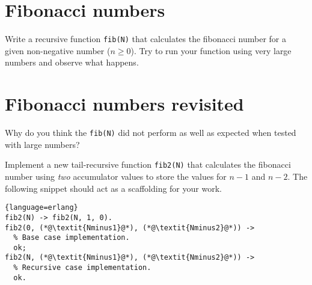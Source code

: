 \documentclass[11pt, a4paper]{article}
\begin{document}
\begin{assignment}

  \section{Fibonacci numbers}

  Write a recursive function \texttt{fib(N)} that calculates the fibonacci number for a given non-negative number (\ie $n \geq 0$).
  Try to run your function using very large numbers and observe what happens.

  \section{Fibonacci numbers revisited}

  Why do you think the \texttt{fib(N)} did not perform as well as expected when tested with large numbers?

  \medskip
  Implement a new tail-recursive function \texttt{fib2(N)} that calculates the fibonacci number using \emph{two} accumulator values to store the values for $n - 1$ and $n - 2$. The following snippet should act as a scaffolding for your work.

\begin{lstlisting}{language=erlang}
fib2(N) -> fib2(N, 1, 0).
fib2(0, (*@\textit{Nminus1}@*), (*@\textit{Nminus2}@*)) ->
  % Base case implementation.
  ok;
fib2(N, (*@\textit{Nminus1}@*), (*@\textit{Nminus2}@*)) ->
  % Recursive case implementation.
  ok.
\end{lstlisting}

\end{assignment}
\end{document}
